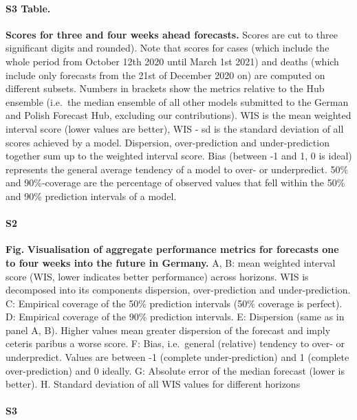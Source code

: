 \documentclass[10pt,letterpaper]{article}
\begin{document}
\paragraph*{S3 Table.}
\label{tab:score-table-4}

\textbf{Scores for three and four weeks ahead forecasts.} Scores are cut
to three significant digits and rounded). Note that scores for cases
(which include the whole period from October 12th 2020 until March 1st
2021) and deaths (which include only forecasts from the 21st of December
2020 on) are computed on different subsets. Numbers in brackets show the
metrics relative to the Hub ensemble (i.e.~the median ensemble of all
other models submitted to the German and Polish Forecast Hub, excluding
our contributions). WIS is the mean weighted interval score (lower
values are better), WIS - sd is the standard deviation of all scores
achieved by a model. Dispersion, over-prediction and under-prediction
together sum up to the weighted interval score. Bias (between -1 and 1,
0 is ideal) represents the general average tendency of a model to over-
or underpredict. 50\% and 90\%-coverage are the percentage of observed
values that fell within the 50\% and 90\% prediction intervals of a
model.

\paragraph{S2}

\textbf{Fig.} \label{fig:agg-performance-all-Germany}
\textbf{Visualisation of aggregate performance metrics for forecasts one to four weeks into the future in Germany.}
A, B: mean weighted interval score (WIS, lower indicates better
performance) across horizons. WIS is decomposed into its components
dispersion, over-prediction and under-prediction. C: Empirical coverage
of the 50\% prediction intervals (50\% coverage is perfect). D:
Empirical coverage of the 90\% prediction intervals. E: Dispersion (same
as in panel A, B). Higher values mean greater dispersion of the forecast
and imply ceteris paribus a worse score. F: Bias, i.e.~general
(relative) tendency to over- or underpredict. Values are between -1
(complete under-prediction) and 1 (complete over-prediction) and 0
ideally. G: Absolute error of the median forecast (lower is better). H.
Standard deviation of all WIS values for different horizons

\paragraph{S3}
\end{document}
